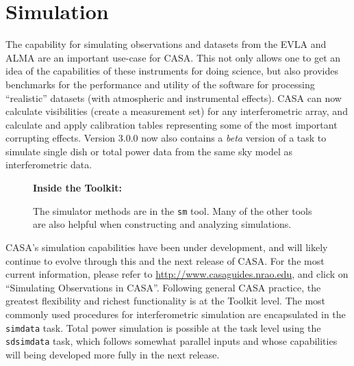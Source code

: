

\chapter[Appendix: Simulation]{Simulation}
\label{chapter:sim}

The capability for simulating observations and datasets from the EVLA
and ALMA are an important use-case for CASA.  This not only allows one
to get an idea of the capabilities of these instruments for doing
science, but also provides benchmarks for the performance and utility
of the software for processing ``realistic'' datasets (with
atmospheric and instrumental effects).  CASA can now calculate
visibilities (create a measurement set) for any interferometric array,
and calculate and apply calibration tables representing some of the
most important corrupting effects.  Version 3.0.0 now also contains a
{\em beta} version of a task to simulate single dish or total power
data from the same sky model as interferometric data.

\begin{wrapfigure}{r}{2.5in}
  \begin{boxedminipage}{2.5in}
     \centerline{\bf Inside the Toolkit:}
     The simulator methods are in the {\tt sm} tool.
     Many of the other tools are also helpful when
     constructing and analyzing simulations.
  \end{boxedminipage}
\end{wrapfigure}

CASA's simulation capabilities have been under development, and will
likely continue to evolve through this and the next release of CASA.
For the most current information, please refer to
\url{http://www.casaguides.nrao.edu}, and click on ``Simulating
Observations in CASA''.
%
Following general CASA practice, the greatest flexibility and richest
functionality is at the Toolkit level.  The most commonly used
procedures for interferometric simulation are encapsulated in the {\tt
  simdata} task.  Total power simulation is possible at the task level
using the {\tt sdsimdata} task, which follows somewhat parallel inputs
and whose capabilities will being developed more fully in the next
release.

